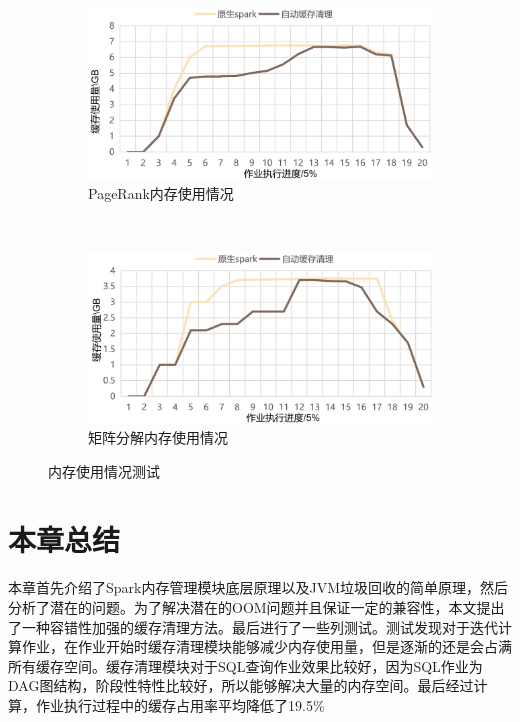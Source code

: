 \begin{figure}
\begin{subfigure}[b]{0.45\linewidth}
      \includegraphics[width=\textwidth]{Img/pg3.jpg}
      \caption{PageRank内存使用情况}
      \label{fig:pagerank-use}
    \end{subfigure}%
    ~%
    \begin{subfigure}[b]{0.45\linewidth}
      \includegraphics[width=\textwidth]{Img/mx3.jpg}
      \caption{矩阵分解内存使用情况}
      \label{fig:matrix-use}
    \end{subfigure}
    \caption{内存使用情况测试}
    \label{fig:memory-use}
\end{figure}

\section{本章总结}

本章首先介绍了Spark内存管理模块底层原理以及JVM垃圾回收的简单原理，然后分析了潜在的问题。为了解决潜在的OOM问题并且保证一定的兼容性，本文提出了一种容错性加强的缓存清理方法。最后进行了一些列测试。测试发现对于迭代计算作业，在作业开始时缓存清理模块能够减少内存使用量，但是逐渐的还是会占满所有缓存空间。缓存清理模块对于SQL查询作业效果比较好，因为SQL作业为DAG图结构，阶段性特性比较好，所以能够解决大量的内存空间。最后经过计算，作业执行过程中的缓存占用率平均降低了19.5\%